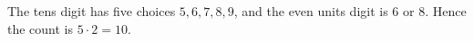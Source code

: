 The tens digit has five choices $5,6,7,8,9$, and the even units digit is $6$ or $8$. Hence the count is $5\cdot2=\boxed{10}$.
